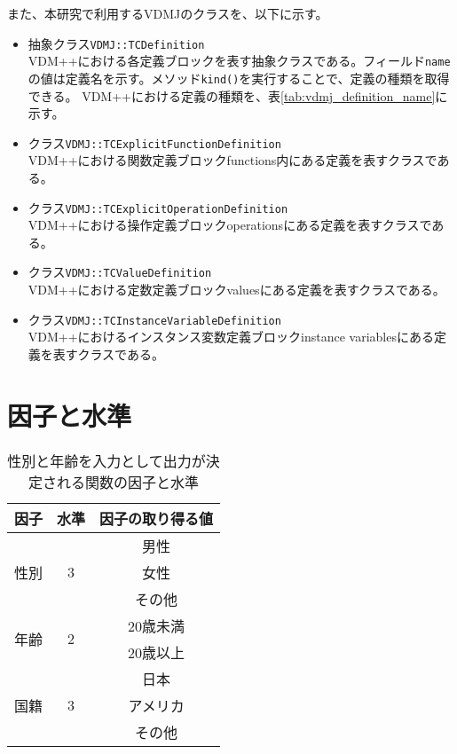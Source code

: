 \documentclass[uplatex, report, a4j, 10pt]{jsbook}
\newcommand\ttt[1]{\texttt{#1}}
\begin{document}
また、本研究で利用するVDMJのクラスを、以下に示す。

\begin{itemize}
  \item 抽象クラス\ttt{VDMJ::TCDefinition}\\
        VDM++における各定義ブロックを表す抽象クラスである。フィールド\ttt{name}の値は定義名を示す。メソッド\ttt{kind()}を実行することで、定義の種類を取得できる。
        VDM++における定義の種類を、表\ref{tab:vdmj_definition_name}に示す。
  \item クラス\ttt{VDMJ::TCExplicitFunctionDefinition}\\
        VDM++における関数定義ブロックfunctions内にある定義を表すクラスである。
  \item クラス\ttt{VDMJ::TCExplicitOperationDefinition}\\
        VDM++における操作定義ブロックoperationsにある定義を表すクラスである。
  \item クラス\ttt{VDMJ::TCValueDefinition}\\
        VDM++における定数定義ブロックvaluesにある定義を表すクラスである。
  \item クラス\ttt{VDMJ::TCInstanceVariableDefinition}\\
        VDM++におけるインスタンス変数定義ブロックinstance variablesにある定義を表すクラスである。
\end{itemize}

\section{因子と水準}\label{sec:factor_and_level}
\begin{table}[tp]
  \begin{center}
    \caption{性別と年齢を入力として出力が決定される関数の因子と水準}
    \label{tab:factor_level}
    \begin{tabular}{c|c|c}
      因子                  & 水準               & 因子の取り得る値 \\
      \hline
      \hline
                            &                    & 男性             \\  \cline{3-3}
      性別                  & 3                  & 女性             \\ \cline{3-3}
                            &                    & その他           \\ \hline
      \multirow{2}{*}{年齢} & \multirow{2}{*}{2} & 20歳未満         \\ \cline{3-3}
                            &                    & 20歳以上         \\ \hline
                            &                    & 日本             \\  \cline{3-3}
      国籍                  & 3                  & アメリカ         \\ \cline{3-3}
                            &                    & その他           \\ \hline
    \end{tabular}
  \end{center}
\end{table}
\end{document}
